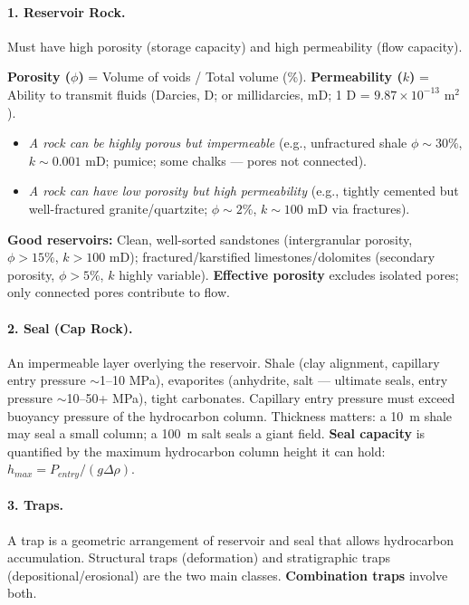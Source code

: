 \documentclass[11pt]{article}
\newcommand{\cle}[1]{{\popxbold\color{popdark}#1}}
\begin{document}
\paragraph{1. Reservoir Rock.}
Must have high \cle{porosity} (storage capacity) and high \cle{permeability} (flow capacity).

\begin{propriete}
\textbf{Porosity ($\phi$)} = Volume of voids / Total volume (\%). \textbf{Permeability ($k$)} = Ability to transmit fluids (Darcies, D; or millidarcies, mD; 1 D = $9.87\times10^{-13}$ m$^2$).
\begin{itemize}
    \item \emph{A rock can be highly porous but impermeable} (e.g., unfractured shale $\phi\sim30\%$, $k\sim0.001$ mD; pumice; some chalks — pores not connected).
    \item \emph{A rock can have low porosity but high permeability} (e.g., tightly cemented but well-fractured granite/quartzite; $\phi\sim2\%$, $k\sim100$ mD via fractures).
\end{itemize}
\textbf{Good reservoirs:} Clean, well-sorted sandstones (intergranular porosity, $\phi>15\%$, $k>100$ mD); fractured/karstified limestones/dolomites (secondary porosity, $\phi>5\%$, $k$ highly variable). \textbf{Effective porosity} excludes isolated pores; only connected pores contribute to flow.
\end{propriete}

\paragraph{2. Seal (Cap Rock).}
An impermeable layer overlying the reservoir. \cle{Shale} (clay alignment, capillary entry pressure $\sim$1--10 MPa), \cle{evaporites} (anhydrite, salt — ultimate seals, entry pressure $\sim$10--50+ MPa), tight carbonates. Capillary entry pressure must exceed buoyancy pressure of the hydrocarbon column. Thickness matters: a \SI{10}{\meter} shale may seal a small column; a \SI{100}{\meter} salt seals a giant field. \textbf{Seal capacity} is quantified by the maximum hydrocarbon column height it can hold: $h_{max} = P_{entry} / (g \Delta\rho)$.

\paragraph{3. Traps.}
A trap is a geometric arrangement of reservoir and seal that allows hydrocarbon accumulation. \cle{Structural traps} (deformation) and \cle{stratigraphic traps} (depositional/erosional) are the two main classes. \textbf{Combination traps} involve both.
\end{document}
